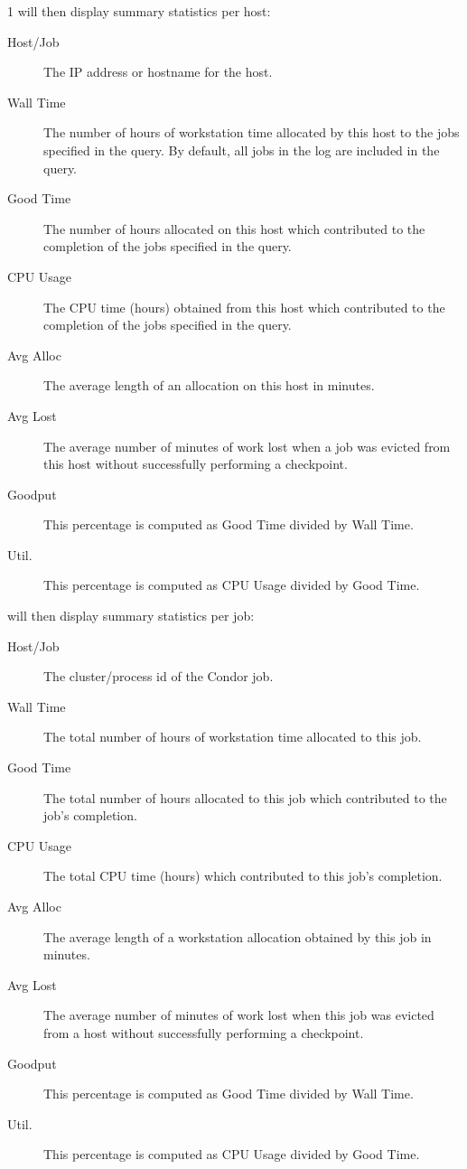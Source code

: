 \begin{ManPage}{\label{man-condor-userlog}}{1}
 will then display summary statistics per host:

\begin{description}
\item[Host/Job] The IP address or hostname for the host.
\item[Wall Time] The number of hours of workstation time allocated by
this host to the jobs specified in the query.  By default, all jobs in
the log are included in the query.
\item[Good Time] The number of hours allocated on this host which
contributed to the completion of the jobs specified in the query.
\item[CPU Usage] The CPU time (hours) obtained from this host which
contributed to the completion of the jobs specified in the query.
\item[Avg Alloc] The average length of an allocation on this host in minutes.
\item[Avg Lost] The average number of minutes of work lost when a job
was evicted from this host without successfully performing a checkpoint.
\item[Goodput] This percentage is computed as Good Time divided by
Wall Time.
\item[Util.] This percentage is computed as CPU Usage divided by Good
Time.
\end{description}

 will then display summary statistics per job:

\begin{description}
\item[Host/Job] The cluster/process id of the Condor job.
\item[Wall Time] The total number of hours of workstation time allocated to
this job.
\item[Good Time] The total number of hours allocated to this job which
contributed to the job's completion.
\item[CPU Usage] The total CPU time (hours) which contributed to this
job's completion.
\item[Avg Alloc] The average length of a workstation allocation
obtained by this job in minutes.
\item[Avg Lost] The average number of minutes of work lost when this job
was evicted from a host without successfully performing a checkpoint.
\item[Goodput] This percentage is computed as Good Time divided by
Wall Time.
\item[Util.] This percentage is computed as CPU Usage divided by Good
Time.
\end{description}


\end{ManPage}
